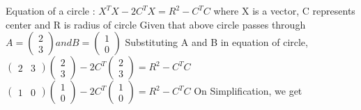 \documentclass{beamer}
\begin{document}
\begin{frame}\center


Equation of a circle :
\linebreak
\linebreak $X^TX -2C^TX = R^2 - C^TC$
\linebreak where X is a vector, C represents center and R is radius of 
circle
\linebreak 
\linebreak Given that above circle passes through $A=\begin{pmatrix}
2\\
3\end{pmatrix} and B=\begin{pmatrix}
1\\
0\end{pmatrix}$
\linebreak Substituting A and B in equation of circle,
\linebreak $\begin{pmatrix}
2 & 3\end{pmatrix} \begin{pmatrix}
2\\
3\end{pmatrix} - 2C^T \begin{pmatrix}
2\\
3\end{pmatrix} = R^2 - C^TC$
\linebreak $\begin{pmatrix}
1 & 0\end{pmatrix} \begin{pmatrix}
1\\
0\end{pmatrix} - 2C^T \begin{pmatrix}
1\\
0\end{pmatrix} = R^2 - C^TC$
\linebreak
\linebreak On Simplification, we get

\end{frame}
\end{document}
